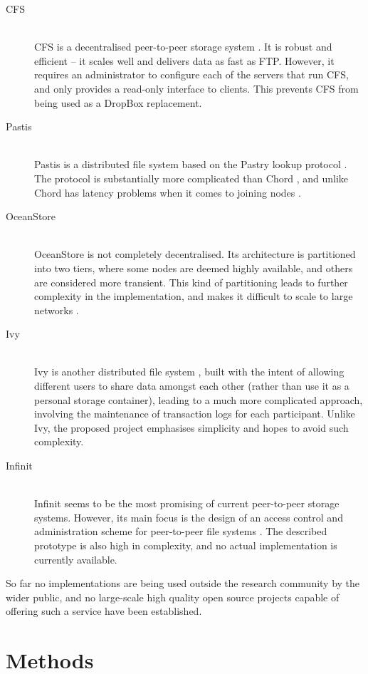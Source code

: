 \documentclass[a4paper, 11pt]{article}
\begin{document}
\begin{description}
  \item[CFS] \hfill \\ 
  CFS is a decentralised peer-to-peer storage system \cite{cfs}. It is robust and efficient -- it scales well and delivers data as fast as FTP. However, it requires an administrator to configure each of the servers that run CFS, and only provides a read-only interface to clients. This prevents CFS from being used as a DropBox replacement. 
  \item[Pastis] \hfill \\
  Pastis is a distributed file system based on the Pastry lookup protocol \cite{pastis}. The protocol is substantially more complicated than Chord \cite{chord}, and unlike Chord has latency problems when it comes to joining nodes \cite{chordalt}.
  \item[OceanStore] \hfill \\
  OceanStore \cite{oceanstore} is not completely decentralised. Its architecture is partitioned into two tiers, where some nodes are deemed highly available, and others are considered more transient. This kind of partitioning leads to further complexity in the implementation, and makes it difficult to scale to large networks \cite{towards}.
  \item[Ivy] \hfill \\
  Ivy is another distributed file system \cite{ivy}, built with the intent of allowing different users to share data amongst each other (rather than use it as a personal storage container), leading to a much more complicated approach, involving the maintenance of transaction logs for each participant. Unlike Ivy, the proposed project emphasises simplicity and hopes to avoid such complexity.
  \item[Infinit] \hfill \\ 
  Infinit seems to be the most promising of current peer-to-peer storage systems. However, its main focus is the design of an access control and administration scheme for peer-to-peer file systems \cite{towards}. The described prototype is also high in complexity, and no actual implementation is currently available.
\end{description}

So far no implementations are being used outside the research community by the wider public, and no large-scale high quality open source projects capable of offering such a service have been established.

\section{Methods}
\end{document}
